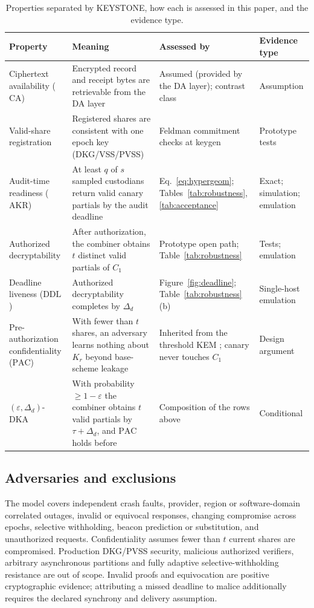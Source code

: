 \documentclass[10pt]{article}
\newcommand{\CA}{\mathrm{CA}}
\newcommand{\AKR}{\mathrm{AKR}}
\newcommand{\DDL}{\mathrm{DDL}}
\newcommand{\PAC}{\mathrm{PAC}}
\begin{document}
\begin{table}[!htbp]
\centering
\caption{Properties separated by KEYSTONE, how each is assessed in this paper, and the evidence type.}
\label{tab:properties}
\small
\begin{tabularx}{\textwidth}{@{}>{\raggedright\arraybackslash}p{}X>{\raggedright\arraybackslash}p{}>{\raggedright\arraybackslash}p{}@{}}
\toprule
Property & Meaning & Assessed by & Evidence type\\
\midrule
Ciphertext availability ($\CA$) & Encrypted record and receipt bytes are retrievable from the DA layer & Assumed (provided by the DA layer); contrast class & Assumption\\
Valid-share registration & Registered shares are consistent with one epoch key (DKG/VSS/PVSS) & Feldman commitment checks at keygen & Prototype tests\\
Audit-time readiness ($\AKR$) & At least $q$ of $s$ sampled custodians return valid canary partials by the audit deadline & Eq.~\eqref{eq:hypergeom}; Tables~\ref{tab:robustness}, \ref{tab:acceptance} & Exact; simulation; emulation\\
Authorized decryptability & After authorization, the combiner obtains $t$ distinct valid partials of $C_1$ & Prototype open path; Table~\ref{tab:robustness} & Tests; emulation\\
Deadline liveness ($\DDL$) & Authorized decryptability completes by $\Delta_d$ & Figure~\ref{fig:deadline}; Table~\ref{tab:robustness}(b) & Single-host emulation\\
Pre-authorization confidentiality ($\PAC$) & With fewer than $t$ shares, an adversary learns nothing about $K_r$ beyond base-scheme leakage & Inherited from the threshold KEM \citep{boneh2006threshold}; canary never touches $C_1$ & Design argument\\
$(\varepsilon,\Delta_d)$-DKA & With probability $\geq 1-\varepsilon$ the combiner obtains $t$ valid partials by $\tau+\Delta_d$, and $\PAC$ holds before & Composition of the rows above & Conditional\\
\bottomrule
\end{tabularx}
\end{table}

\subsection{Adversaries and exclusions}

The model covers independent crash faults, provider, region or software-domain correlated outages, invalid or equivocal responses, changing compromise across epochs, selective withholding, beacon prediction or substitution, and unauthorized requests. Confidentiality assumes fewer than $t$ current shares are compromised. Production DKG/PVSS security, malicious authorized verifiers, arbitrary asynchronous partitions and fully adaptive selective-withholding resistance are out of scope. Invalid proofs and equivocation are positive cryptographic evidence; attributing a missed deadline to malice additionally requires the declared synchrony and delivery assumption.
\end{document}
